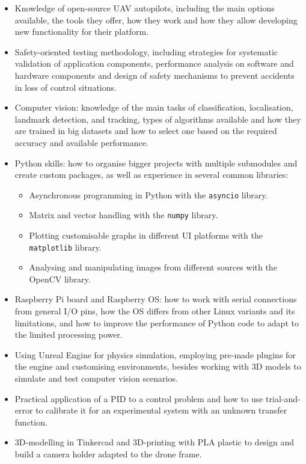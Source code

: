 \begin{itemize}
    \item Knowledge of open-source UAV autopilots, including the main options available, the tools they offer, how they work and how they allow developing new functionality for their platform.

    \item Safety-oriented testing methodology, including strategies for systematic validation of application components, performance analysis on software and hardware components and design of safety mechanisms to prevent accidents in loss of control situations.

    \item Computer vision: knowledge of the main tasks of classification, localisation, landmark detection, and tracking, types of algorithms available and how they are trained in big datasets and how to select one based on the required accuracy and available performance.

    \item Python skills: how to organise bigger projects with multiple submodules and create custom packages, as well as experience in several common libraries:
    \begin{itemize}
        \item Asynchronous programming in Python with the \texttt{asyncio} library.
        \item Matrix and vector handling with the \texttt{numpy} library.
        \item Plotting customisable graphs in different UI platforms with the \texttt{matplotlib} library.
        \item Analysing and manipulating images from different sources with the OpenCV library.
    \end{itemize}
    

    \item Raspberry Pi board and Raspberry OS: how to work with serial connections from general I/O pins, how the OS differs from other Linux variants and its limitations, and how to improve the performance of Python code to adapt to the limited processing power.

    \item Using Unreal Engine for physics simulation, employing pre-made plugins for the engine and customising environments, besides working with 3D models to simulate and test computer vision scenarios.

    \item Practical application of a PID to a control problem and how to use trial-and-error to calibrate it for an experimental system with an unknown transfer function.

    \item 3D-modelling in Tinkercad and 3D-printing with PLA plastic to design and build a camera holder adapted to the drone frame.
\end{itemize}


